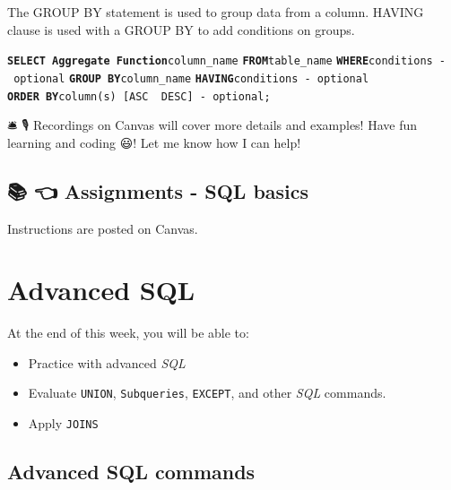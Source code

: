 \documentclass[
  letterpaper,
  DIV=11,
  numbers=noendperiod]{scrreprt}
\providecommand{\tightlist}{%
  \setlength{\itemsep}{0pt}\setlength{\parskip}{0pt}}\usepackage{longtable,booktabs,array}
\begin{document}
The GROUP BY statement is used to group data from a column. HAVING
clause is used with a GROUP BY to add conditions on groups.

\textbf{\texttt{SELECT\ Aggregate\ Function}}\texttt{column\_name}
\textbf{\texttt{FROM}}\texttt{table\_name}
\textbf{\texttt{WHERE}}\texttt{conditions\ -\ optional}
\textbf{\texttt{GROUP\ BY}}\texttt{column\_name}
\textbf{\texttt{HAVING}}\texttt{conditions\ -\ optional}
\textbf{\texttt{ORDER\ BY}}\texttt{column(s)\ {[}ASC\ \textbar{}\ DESC{]}\ -\ optional;}

🛎 🎙️ Recordings on Canvas will cover more details and examples! Have fun
learning and coding 😃! Let me know how I can help!

\hypertarget{assignments---sql-basics}{%
\section*{📚 👈 Assignments - SQL
basics}\label{assignments---sql-basics}}


Instructions are posted on Canvas.

\hypertarget{advanced-sql}{%
\chapter*{Advanced SQL}\label{advanced-sql}}


At the end of this week, you will be able to:

\begin{itemize}
\tightlist
\item
  Practice with advanced \emph{SQL}
\item
  Evaluate \texttt{UNION}, \texttt{Subqueries}, \texttt{EXCEPT}, and
  other \emph{SQL} commands.
\item
  Apply \texttt{JOINS}
\end{itemize}

\hypertarget{advanced-sql-commands}{%
\section*{Advanced SQL commands}\label{advanced-sql-commands}}

\end{document}
